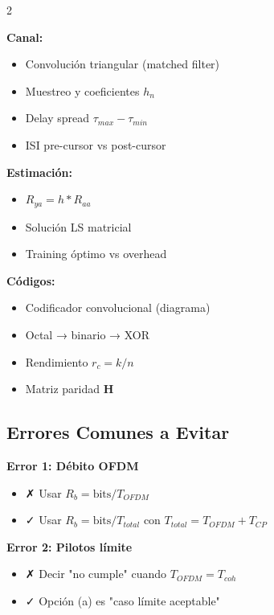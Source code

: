 \documentclass[10pt,a4paper]{article}
\begin{document}
\begin{multicols}{2}
\begin{tcolorbox}[colback=verdeclaro!10,colframe=azuloscuro,title=Verifica que sabes]
\textbf{Canal:}
\begin{itemize}
\item[$\square$] Convolución triangular (matched filter)
\item[$\square$] Muestreo y coeficientes $h_n$
\item[$\square$] Delay spread $\tau_{max} - \tau_{min}$
\item[$\square$] ISI pre-cursor vs post-cursor
\end{itemize}

\textbf{Estimación:}
\begin{itemize}
\item[$\square$] $R_{ya} = h * R_{aa}$
\item[$\square$] Solución LS matricial
\item[$\square$] Training óptimo vs overhead
\end{itemize}

\textbf{Códigos:}
\begin{itemize}
\item[$\square$] Codificador convolucional (diagrama)
\item[$\square$] Octal → binario → XOR
\item[$\square$] Rendimiento $r_c = k/n$
\item[$\square$] Matriz paridad $\mathbf{H}$
\end{itemize}

\end{tcolorbox}

\subsection{Errores Comunes a Evitar}

\begin{tcolorbox}[colback=rojoclaro!10,colframe=rojoclaro!70!black,title=¡CUIDADO!]

\textbf{Error 1: Débito OFDM}
\begin{itemize}
\item ✗ Usar $R_b = \text{bits}/T_{OFDM}$
\item ✓ Usar $R_b = \text{bits}/T_{total}$ con $T_{total} = T_{OFDM} + T_{CP}$
\end{itemize}

\textbf{Error 2: Pilotos límite}
\begin{itemize}
\item ✗ Decir "no cumple" cuando $T_{OFDM} = T_{coh}$
\item ✓ Opción (a) es "caso límite aceptable"
\end{itemize}


\end{tcolorbox}
\end{multicols}
\end{document}
